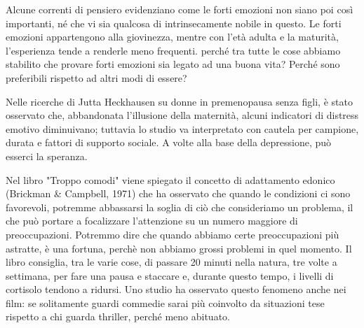 \documentclass[12pt]{book} %
\begin{document}
Alcune correnti di pensiero evidenziano come le forti emozioni non siano poi così importanti, né che vi sia qualcosa di intrinsecamente nobile in questo. Le forti emozioni appartengono alla giovinezza, mentre con l'età adulta e la maturità, l'esperienza tende a renderle meno frequenti. perché tra tutte le cose abbiamo stabilito che provare forti emozioni sia legato ad una buona vita? Perché sono preferibili rispetto ad altri modi di essere?

Nelle ricerche di Jutta Heckhausen su donne in premenopausa senza figli, è stato osservato che, abbandonata l’illusione della maternità, alcuni indicatori di distress emotivo diminuivano; tuttavia lo studio va interpretato con cautela per campione, durata e fattori di supporto sociale. A volte alla base della depressione, può esserci la speranza. 

Nel libro "Troppo comodi" viene spiegato il concetto di adattamento edonico (Brickman \& Campbell, 1971) che ha osservato che quando le condizioni ci sono favorevoli, potremme abbassarsi la soglia di ciò che consideriamo un problema, il che può portare a focalizzare l'attenzione su un numero maggiore di preoccupazioni. Potremmo dire che quando abbiamo certe preoccupazioni più astratte, è una fortuna, perchè non abbiamo grossi problemi in quel momento. Il libro consiglia, tra le varie cose, di passare 20 minuti nella natura, tre volte a settimana, per fare una pausa e staccare e, durante questo tempo, i livelli di cortisolo tendono a ridursi. Uno studio ha osservato questo fenomeno anche nei film: se solitamente guardi commedie sarai più coinvolto da situazioni tese rispetto a chi guarda thriller, perché meno abituato.
\end{document}
